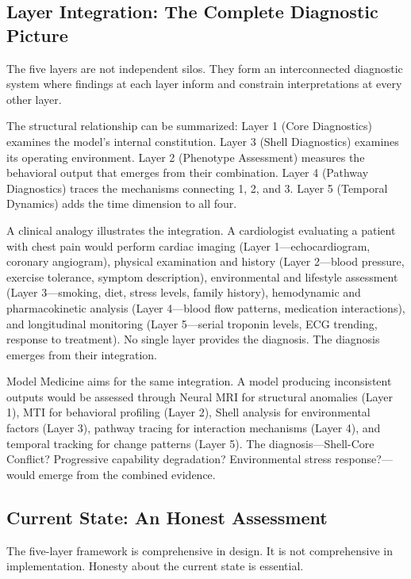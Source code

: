 \documentclass[11pt]{article}
\begin{document}
\subsection{Layer Integration: The Complete Diagnostic Picture}

The five layers are not independent silos. They form an interconnected diagnostic system where findings at each layer inform and constrain interpretations at every other layer.

The structural relationship can be summarized: Layer 1 (Core Diagnostics) examines the model's internal constitution. Layer 3 (Shell Diagnostics) examines its operating environment. Layer 2 (Phenotype Assessment) measures the behavioral output that emerges from their combination. Layer 4 (Pathway Diagnostics) traces the mechanisms connecting 1, 2, and 3. Layer 5 (Temporal Dynamics) adds the time dimension to all four.

A clinical analogy illustrates the integration. A cardiologist evaluating a patient with chest pain would perform cardiac imaging (Layer 1---echocardiogram, coronary angiogram), physical examination and history (Layer 2---blood pressure, exercise tolerance, symptom description), environmental and lifestyle assessment (Layer 3---smoking, diet, stress levels, family history), hemodynamic and pharmacokinetic analysis (Layer 4---blood flow patterns, medication interactions), and longitudinal monitoring (Layer 5---serial troponin levels, ECG trending, response to treatment). No single layer provides the diagnosis. The diagnosis emerges from their integration.

Model Medicine aims for the same integration. A model producing inconsistent outputs would be assessed through Neural MRI for structural anomalies (Layer 1), MTI for behavioral profiling (Layer 2), Shell analysis for environmental factors (Layer 3), pathway tracing for interaction mechanisms (Layer 4), and temporal tracking for change patterns (Layer 5). The diagnosis---Shell-Core Conflict? Progressive capability degradation? Environmental stress response?---would emerge from the combined evidence.

\subsection{Current State: An Honest Assessment}

The five-layer framework is comprehensive in design. It is not comprehensive in implementation. Honesty about the current state is essential.
\end{document}
